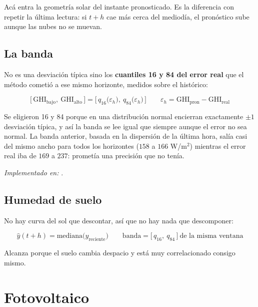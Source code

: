\documentclass[11pt,a4paper]{article}
\begin{document}
Acá entra la geometría solar del instante pronosticado. Es la diferencia con repetir la
última lectura: si $t+h$ cae más cerca del mediodía, el pronóstico sube aunque las nubes
no se muevan.

\subsection{La banda}

No es una desviación típica sino los \textbf{cuantiles 16 y 84 del error real} que el
método cometió a ese mismo horizonte, medidos sobre el histórico:

\begin{equation*}
  \big[\,\mathrm{GHI_{bajo}},\ \mathrm{GHI_{alto}}\,\big] =
  \Big[\, q_{16}\big(\varepsilon_h\big),\ q_{84}\big(\varepsilon_h\big) \,\Big]
  \qquad \varepsilon_h = \mathrm{GHI_{pron}} - \mathrm{GHI_{real}}
\end{equation*}

Se eligieron 16 y 84 porque en una distribución normal encierran exactamente $\pm 1$
desviación típica, y así la banda se lee igual que siempre aunque el error no sea normal.
La banda anterior, basada en la dispersión de la última hora, salía casi del mismo ancho
para todos los horizontes ($158$ a $166$ W/m$^2$) mientras el error real iba de $169$ a
$237$: prometía una precisión que no tenía.

\emph{Implementado en:} .

\subsection{Humedad de suelo}

No hay curva del sol que descontar, así que no hay nada que descomponer:

\begin{equation*}
  \hat{y}(t+h) = \mathrm{mediana}\big(y_{\text{reciente}}\big)
  \qquad
  \text{banda} = \big[\,q_{16},\ q_{84}\,\big]\ \text{de la misma ventana}
\end{equation*}

Alcanza porque el suelo cambia despacio y está muy correlacionado consigo mismo.

\section{Fotovoltaico}
\end{document}
